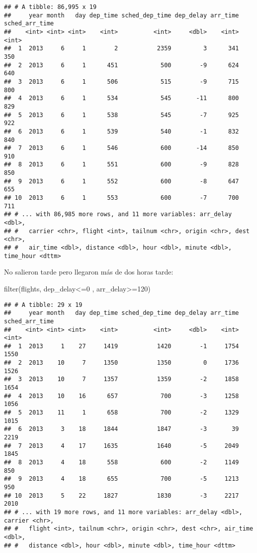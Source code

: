 \documentclass[
]{article}
\newenvironment{Shaded}{\begin{snugshade}}{\end{snugshade}}
\newcommand{\DecValTok}[1]{\textcolor[rgb]{0.00,0.00,0.81}{#1}}
\newcommand{\FunctionTok}[1]{\textcolor[rgb]{0.00,0.00,0.00}{#1}}
\newcommand{\NormalTok}[1]{#1}
\newcommand{\SpecialCharTok}[1]{\textcolor[rgb]{0.00,0.00,0.00}{#1}}
\begin{document}
\begin{verbatim}
## # A tibble: 86,995 x 19
##     year month   day dep_time sched_dep_time dep_delay arr_time sched_arr_time
##    <int> <int> <int>    <int>          <int>     <dbl>    <int>          <int>
##  1  2013     6     1        2           2359         3      341            350
##  2  2013     6     1      451            500        -9      624            640
##  3  2013     6     1      506            515        -9      715            800
##  4  2013     6     1      534            545       -11      800            829
##  5  2013     6     1      538            545        -7      925            922
##  6  2013     6     1      539            540        -1      832            840
##  7  2013     6     1      546            600       -14      850            910
##  8  2013     6     1      551            600        -9      828            850
##  9  2013     6     1      552            600        -8      647            655
## 10  2013     6     1      553            600        -7      700            711
## # ... with 86,985 more rows, and 11 more variables: arr_delay <dbl>,
## #   carrier <chr>, flight <int>, tailnum <chr>, origin <chr>, dest <chr>,
## #   air_time <dbl>, distance <dbl>, hour <dbl>, minute <dbl>, time_hour <dttm>
\end{verbatim}

No salieron tarde pero llegaron más de dos horas tarde:

\begin{Shaded}
\begin{Highlighting}[]
\FunctionTok{filter}\NormalTok{(flights, dep\_delay}\SpecialCharTok{\textless{}=}\DecValTok{0}\NormalTok{ , arr\_delay}\SpecialCharTok{\textgreater{}=}\DecValTok{120}\NormalTok{)}
\end{Highlighting}
\end{Shaded}

\begin{verbatim}
## # A tibble: 29 x 19
##     year month   day dep_time sched_dep_time dep_delay arr_time sched_arr_time
##    <int> <int> <int>    <int>          <int>     <dbl>    <int>          <int>
##  1  2013     1    27     1419           1420        -1     1754           1550
##  2  2013    10     7     1350           1350         0     1736           1526
##  3  2013    10     7     1357           1359        -2     1858           1654
##  4  2013    10    16      657            700        -3     1258           1056
##  5  2013    11     1      658            700        -2     1329           1015
##  6  2013     3    18     1844           1847        -3       39           2219
##  7  2013     4    17     1635           1640        -5     2049           1845
##  8  2013     4    18      558            600        -2     1149            850
##  9  2013     4    18      655            700        -5     1213            950
## 10  2013     5    22     1827           1830        -3     2217           2010
## # ... with 19 more rows, and 11 more variables: arr_delay <dbl>, carrier <chr>,
## #   flight <int>, tailnum <chr>, origin <chr>, dest <chr>, air_time <dbl>,
## #   distance <dbl>, hour <dbl>, minute <dbl>, time_hour <dttm>
\end{verbatim}
\end{document}
